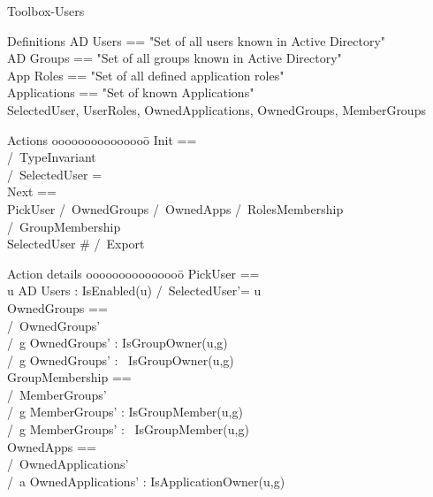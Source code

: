 \documentclass{scrreprt}
\begin{document}
  \tla
  \begin{module}{Toolbox-Users}
    \begin{decls}{Definitions}
      \CONSTANT AD Users == "Set of all users known in Active Directory" \\
      \CONSTANT AD Groups  == "Set of all groups known in Active Directory"\\
      \CONSTANT App Roles == "Set of all defined application roles"\\
      \CONSTANT Applications == "Set of known Applications"\\
      \VARIABLES SelectedUser, UserRoles, OwnedApplications,
      OwnedGroups, MemberGroups
    \end{decls}
    \midbar
    \begin{decls}{Actions}
      ooooooooooooooo\=\kill
      Init ==  \\ 
        \> /\ TypeInvariant\\
        \> /\ SelectedUser = \emptyset{}\\
     Next ==\\
      \> \/  PickUser /\ OwnedGroups /\ OwnedApps /\ RolesMembership /\ GroupMembership\\
      \> \/ SelectedUser # \emptyset{} /\ Export\\
    \end{decls}
    \begin{decls}{Action details}
      ooooooooooooooo\=\kill
      PickUser ==\\
      \> \CHOOSE u \in AD Users : IsEnabled(u) /\ SelectedUser'= u\\
      OwnedGroups ==\\
      \> /\ \exists OwnedGroups' \in {} \\
      \> /\ \forall  g \in OwnedGroups' : IsGroupOwner(u,g)\\
     \> /\ \forall  g \notin OwnedGroups' : ~IsGroupOwner(u,g)\\
     GroupMembership ==\\
      \> /\ \exists MemberGroups' \in {} \\
      \> /\ \forall  g \in MemberGroups' : IsGroupMember(u,g)\\
     \> /\ \forall  g \notin MemberGroups' : ~IsGroupMember(u,g)\\
      OwnedApps ==\\
      \> /\ \exists OwnedApplications' \in {} \\
      \> /\ \forall  a \in OwnedApplications' : IsApplicationOwner(u,g)\\

\end{decls}
\end{module}
\end{document}
